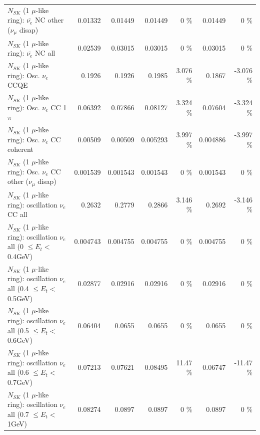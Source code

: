 \begin{table}
\begin{tabular}{| l | r | r | r  r | r  r |}
          $N_{SK}$ (1 $\mu$-like ring): $\bar{\nu_e}$ NC other ($\nu_\mu$ disap) &         0.01332 &         0.01449 &         0.01449 &        0 \%  &         0.01449 &        0 \%  \\ 
                            $N_{SK}$ (1 $\mu$-like ring): $\bar{\nu_{e}}$ NC all &         0.02539 &         0.03015 &         0.03015 &        0 \%  &         0.03015 &        0 \%  \\ 
\hline
\hline
\hline
                                 $N_{SK}$ (1 $\mu$-like ring): Osc. $\nu_e$ CCQE &          0.1926 &          0.1926 &          0.1985 &    3.076 \%  &          0.1867 &   -3.076 \%  \\ 
                            $N_{SK}$ (1 $\mu$-like ring): Osc. $\nu_e$ CC 1$\pi$ &         0.06392 &         0.07866 &         0.08127 &    3.324 \%  &         0.07604 &   -3.324 \%  \\ 
                          $N_{SK}$ (1 $\mu$-like ring): Osc. $\nu_e$ CC coherent &         0.00509 &         0.00509 &        0.005293 &    3.997 \%  &        0.004886 &   -3.997 \%  \\ 
           $N_{SK}$ (1 $\mu$-like ring): Osc. $\nu_e$ CC other ($\nu_\mu$ disap) &        0.001539 &        0.001543 &        0.001543 &        0 \%  &        0.001543 &        0 \%  \\ 
                        $N_{SK}$ (1 $\mu$-like ring): oscillation $\nu_e$ CC all &          0.2632 &          0.2779 &          0.2866 &    3.146 \%  &          0.2692 &   -3.146 \%  \\ 
\hline
$N_{SK}$ (1 $\mu$-like ring): oscillation $\nu_{e}$ all (0 $\leq E_{t} <$ 0.4GeV) &        0.004743 &        0.004755 &        0.004755 &        0 \%  &        0.004755 &        0 \%  \\ 
$N_{SK}$ (1 $\mu$-like ring): oscillation $\nu_{e}$ all (0.4 $\leq E_{t} <$ 0.5GeV) &         0.02877 &         0.02916 &         0.02916 &        0 \%  &         0.02916 &        0 \%  \\ 
$N_{SK}$ (1 $\mu$-like ring): oscillation $\nu_{e}$ all (0.5 $\leq E_{t} <$ 0.6GeV) &         0.06404 &          0.0655 &          0.0655 &        0 \%  &          0.0655 &        0 \%  \\ 
$N_{SK}$ (1 $\mu$-like ring): oscillation $\nu_{e}$ all (0.6 $\leq E_{t} <$ 0.7GeV) &         0.07213 &         0.07621 &         0.08495 &    11.47 \%  &         0.06747 &   -11.47 \%  \\ 
$N_{SK}$ (1 $\mu$-like ring): oscillation $\nu_{e}$ all (0.7 $\leq E_{t} <$ 1GeV) &         0.08274 &          0.0897 &          0.0897 &        0 \%  &          0.0897 &        0 \%  \\ 

\end{tabular}
\end{table}
